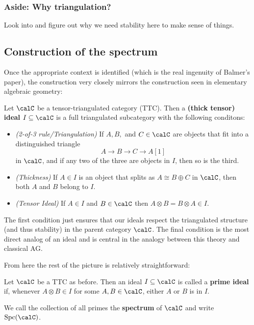 \documentclass[12pt]{article}
\begin{document}
\subsubsection{Aside: Why triangulation?}
{\color{red} Look into and figure out why we need stability here to make sense of things.}

\subsection{Construction of the spectrum}
Once the appropriate context is identified (which is the real ingenuity of Balmer's paper), the construction 
very closely mirrors the construction seen in elementary algebraic geometry:
\begin{defn}
	Let $\calC$ be a tensor-triangulated category (TTC). Then a \textbf{(thick tensor) ideal} $I\subseteq \calC$ is a full triangulated subcategory 
	with the following conditons:
	\begin{itemize}
		\item \textit{(2-of-3 rule/Triangulation)} If $A,B,$ and $C\in\calC$ are objects that fit into a distinguished triangle
		\[A\to B\to C\to A[1]\]
		in $\calC$, and if any two of the three are objects in $I$, then so is the third.
		\item \textit{(Thickness)} If $A\in I$ is an object that splits as $A\cong B\oplus C$ in $\calC$, then both $A$ and $B$ belong to $I$.
		\item \textit{(Tensor Ideal)} If $A\in I$ and $B\in \calC$ then $A\otimes B=B\otimes A\in I$.
	\end{itemize}
\end{defn}

\begin{rmk}
	The first condition just ensures that our ideals respect the triangulated structure (and thus stability) in the parent category $\calC$. 
	The final condition is the most direct analog of an ideal and is central in the analogy between this theory and classical AG.
\end{rmk}
From here the rest of the picture is relatively straightforward:
\begin{defn}
	Let $\calC$ be a TTC as before. Then an ideal $I\subseteq\calC$ is called a \textbf{prime ideal}
	if, whenever $A\otimes B\in I$ for some $A,B\in \calC$, either $A$ or $B$ is in $I$.

	We call the collection of all primes the \textbf{spectrum} of $\calC$ and write 
	$\operatorname{Spc}(\calC)$.
\end{defn}
\end{document}
